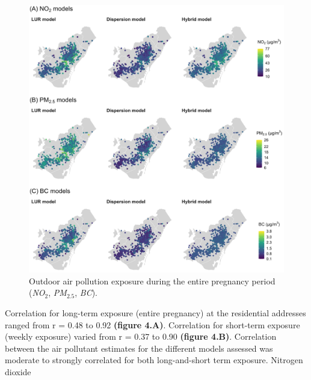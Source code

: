 \documentclass{article}
\begin{document}
\captionsetup[figure]{skip=6pt}
\begin{figure}[!htb]
\includegraphics[width=1.0\textwidth]{figures/all_maps.png}
\caption{Outdoor air pollution exposure during the entire pregnancy period (\textit{NO$_2$}, \textit{PM$_{2.5}$}, \textit{BC}).}
\end{figure}

\newpage
Correlation for long-term exposure (entire pregnancy) at the residential addresses ranged from r = 0.48 to 0.92 \textbf{(figure 4.A)}. Correlation for short-term exposure (weekly exposure) varied from r = 0.37 to 0.90 \textbf{(figure 4.B)}. Correlation between the air pollutant estimates for the different models assessed was moderate to strongly correlated for both long-and-short term exposure. Nitrogen dioxide 
\end{document}
